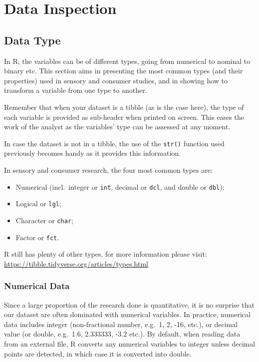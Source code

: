 \documentclass[
]{book}
\providecommand{\tightlist}{%
  \setlength{\itemsep}{0pt}\setlength{\parskip}{0pt}}
\begin{document}
\hypertarget{data-inspection}{%
\section{Data Inspection}\label{data-inspection}}

\hypertarget{data-type}{%
\subsection{Data Type}\label{data-type}}

In R, the variables can be of different types, going from numerical to nominal to binary etc. This section aims in presenting the most common types (and their properties) used in sensory and consumer studies, and in showing how to transform a variable from one type to another.

Remember that when your dataset is a tibble (as is the case here), the type of each variable is provided as sub-header when printed on screen. This eases the work of the analyst as the variables' type can be assessed at any moment.

In case the dataset is not in a tibble, the use of the \texttt{str()} function used previously becomes handy as it provides this information.

In sensory and consumer research, the four most common types are:

\begin{itemize}
\tightlist
\item
  Numerical (incl.~integer or \texttt{int}, decimal or \texttt{dcl}, and double or \texttt{dbl});
\item
  Logical or \texttt{lgl};
\item
  Character or \texttt{char};
\item
  Factor or \texttt{fct}.
\end{itemize}

R still has plenty of other types, for more information please visit: \url{https://tibble.tidyverse.org/articles/types.html}

\hypertarget{numerical-data}{%
\subsubsection{Numerical Data}\label{numerical-data}}

Since a large proportion of the research done is quantitative, it is no surprise that our dataset are often dominated with numerical variables. In practice, numerical data includes integer (non-fractional number, e.g.~1, 2, -16, etc.), or decimal value (or double, e.g.~1.6, 2.333333, -3.2 etc.).
By default, when reading data from an external file, R converts any numerical variables to integer unless decimal points are detected, in which case it is converted into double.
\end{document}

